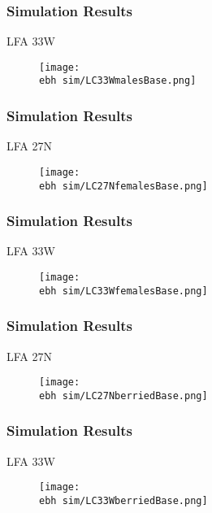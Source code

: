 \documentclass{beamer}
\newcommand{\ebh}{\string~/bio.data/bio.lobster/figures/LFA2733Framework2018/} %
\begin{document}
\begin{frame}
\frametitle{Simulation Results}
LFA 33W 
\begin{figure}
        \begin{center}
            \texttt{[image: \\ebh sim/LC33WmalesBase.png]}
        \end{center}
    \end{figure}
\end{frame}



\begin{frame}
\frametitle{Simulation Results}
LFA 27N 
\begin{figure}
        \begin{center}
            \texttt{[image: \\ebh sim/LC27NfemalesBase.png]}
        \end{center}
    \end{figure}
\end{frame}


\begin{frame}
\frametitle{Simulation Results}
LFA 33W 
\begin{figure}
        \begin{center}
            \texttt{[image: \\ebh sim/LC33WfemalesBase.png]}
        \end{center}
    \end{figure}
\end{frame}


\begin{frame}
\frametitle{Simulation Results}
LFA 27N 
\begin{figure}
        \begin{center}
            \texttt{[image: \\ebh sim/LC27NberriedBase.png]}
        \end{center}
    \end{figure}
\end{frame}


\begin{frame}
\frametitle{Simulation Results}
LFA 33W 
\begin{figure}
        \begin{center}
            \texttt{[image: \\ebh sim/LC33WberriedBase.png]}
        \end{center}
    \end{figure}
\end{frame}
\end{document}

